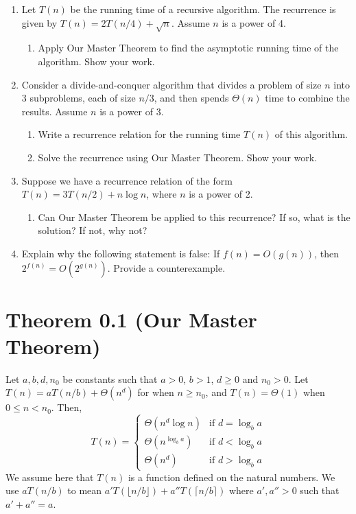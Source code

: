 \documentclass{article}
\begin{document}
\begin{enumerate}
    \item  Let $T(n)$ be the running time of a recursive algorithm.  The recurrence is given by $T(n) = 2T(n/4) + \sqrt{n}$.  Assume $n$ is a power of 4.
    \begin{enumerate}
        \item  Apply Our Master Theorem to find the asymptotic running time of the algorithm. Show your work.
    \end{enumerate}

    \item Consider a divide-and-conquer algorithm that divides a problem of size $n$ into 3 subproblems, each of size $n/3$, and then spends $\Theta(n)$ time to combine the results.  Assume $n$ is a power of 3.
    \begin{enumerate}
        \item Write a recurrence relation for the running time $T(n)$ of this algorithm.
        \item Solve the recurrence using Our Master Theorem. Show your work.
    \end{enumerate}

    \item  Suppose we have a recurrence relation of the form $T(n) = 3T(n/2) + n \log n$, where $n$ is a power of 2.
    \begin{enumerate}
        \item Can Our Master Theorem be applied to this recurrence? If so, what is the solution? If not, why not?
    \end{enumerate}

    \item  Explain why the following statement is false: If $f(n) = O(g(n))$, then $2^{f(n)} = O(2^{g(n)})$. Provide a counterexample.

\end{enumerate}

\section*{Theorem 0.1 (Our Master Theorem)}
Let $a, b, d, n_0$ be constants such that $a > 0$, $b > 1$, $d \ge 0$ and $n_0 > 0$. Let $T(n) = aT(n/b) + \Theta(n^d)$ for when $n \ge n_0$, and $T(n) = \Theta(1)$ when $0 \le n < n_0$. Then,
\[
T(n) = \begin{cases}
    \Theta(n^d \log n) & \text{if } d = \log_b a \\
    \Theta(n^{\log_b a}) & \text{if } d < \log_b a \\
    \Theta(n^d) & \text{if } d > \log_b a
\end{cases}
\]
We assume here that $T(n)$ is a function defined on the natural numbers. We use $aT(n/b)$ to mean $a'T(\lfloor n/b \rfloor) + a''T(\lceil n/b \rceil)$ where $a', a'' > 0$ such that $a' + a'' = a$.
\end{document}
